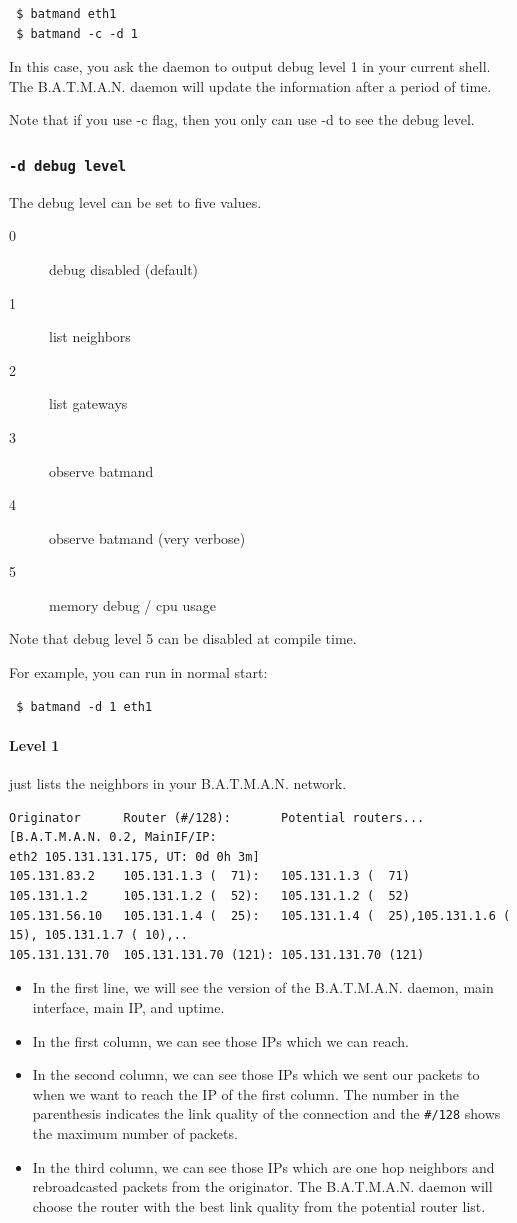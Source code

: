 \documentclass[
	12pt,
	a4paper,
	twoside,
	english,
	headsepline,
	footnosepline,
	automark,
	normalheadings,
	openany,
	cleardoubleplain,
	abstracton,
	idxtotoc,
	liststotoc,
	bibtotoc,
 	BCOR8mm,
]{scrartcl}
\newcommand{\subsubsectionttt}[1]{\subsubsection{\texttt{#1}}}
\begin{document}
\begin{verbatim}
 $ batmand eth1
 $ batmand -c -d 1
\end{verbatim}
In this case, you ask the daemon to output debug level 1 in your current shell.
The B.A.T.M.A.N. daemon will update the information after a period of time.

Note that if you use -c flag, then you only can use -d to see the debug level.

\subsubsectionttt{-d debug level}
The debug level can be set to five values.

\begin{description}
 \item[0] debug disabled (default)
 \item[1] list neighbors
 \item[2] list gateways
 \item[3] observe batmand
 \item[4] observe batmand (very verbose)
 \item[5] memory debug / cpu usage
\end{description}
Note that debug level 5 can be disabled at compile time.

For example, you can run in normal start:
\begin{verbatim}
 $ batmand -d 1 eth1
\end{verbatim}

\paragraph*{Level 1}
just lists the neighbors in your B.A.T.M.A.N. network.

\begin{lstlisting}[basicstyle=\footnotesize,	frame=single, columns= flexible]
Originator      Router (#/128):       Potential routers... [B.A.T.M.A.N. 0.2, MainIF/IP:
eth2 105.131.131.175, UT: 0d 0h 3m]
105.131.83.2    105.131.1.3 (  71):   105.131.1.3 (  71)
105.131.1.2     105.131.1.2 (  52):   105.131.1.2 (  52)
105.131.56.10   105.131.1.4 (  25):   105.131.1.4 (  25),105.131.1.6 ( 15), 105.131.1.7 ( 10),..
105.131.131.70  105.131.131.70 (121): 105.131.131.70 (121)
\end{lstlisting}

\begin{itemize}
\item In the first line, we will see the version of the B.A.T.M.A.N. daemon,
      main interface, main IP, and uptime.
\item In the first column, we can see those IPs which we can reach.
\item In the second column, we can see those IPs which we sent our packets to
      when we want to reach the IP of the first column. The number in the
      parenthesis indicates the link quality of the connection and the
      \verb|#/128| shows the maximum number of packets.
\item In the third column, we can see those IPs which are one hop neighbors and
      rebroadcasted packets from the originator. The B.A.T.M.A.N. daemon will
      choose the router with the best link quality from the potential router
      list.
\end{itemize}
\end{document}
